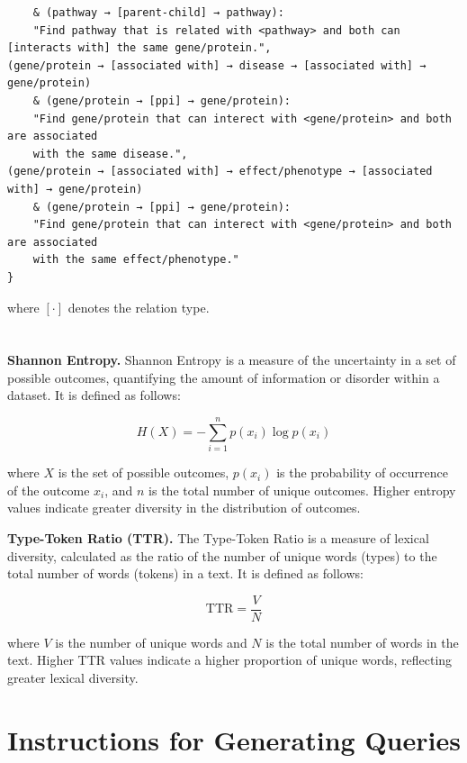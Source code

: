 \begin{mdframed}[backgroundcolor=gray!5, linecolor=black, linewidth=2pt, innerleftmargin=10pt, innerrightmargin=10pt, innertopmargin=3pt, innerbottommargin=10pt]
\begin{scriptsize}
\begin{verbatim}
    & (pathway → [parent-child] → pathway): 
    "Find pathway that is related with <pathway> and both can [interacts with] the same gene/protein.",
(gene/protein → [associated with] → disease → [associated with] → gene/protein) 
    & (gene/protein → [ppi] → gene/protein): 
    "Find gene/protein that can interect with <gene/protein> and both are associated 
    with the same disease.",
(gene/protein → [associated with] → effect/phenotype → [associated with] → gene/protein) 
    & (gene/protein → [ppi] → gene/protein): 
    "Find gene/protein that can interect with <gene/protein> and both are associated 
    with the same effect/phenotype."
}
\end{verbatim}
\end{scriptsize}
\end{mdframed}

where $[\cdot]$ denotes the relation type.
\section{}
\label{app:math}
\textbf{Shannon Entropy.} Shannon Entropy is a measure of the uncertainty in a set of possible outcomes, quantifying the amount of information or disorder within a dataset. It is defined as follows:

\[
H(X) = - \sum_{i=1}^{n} p(x_i) \log p(x_i)
\]

where \( X \) is the set of possible outcomes, \( p(x_i) \) is the probability of occurrence of the outcome \( x_i \), and \( n \) is the total number of unique outcomes. Higher entropy values indicate greater diversity in the distribution of outcomes.\cite{https://doi.org/10.1002/j.1538-7305.1948.tb01338.x}

\textbf{Type-Token Ratio (TTR).} The Type-Token Ratio is a measure of lexical diversity, calculated as the ratio of the number of unique words (types) to the total number of words (tokens) in a text. It is defined as follows:

\[
\text{TTR} = \frac{V}{N}
\]

where \( V \) is the number of unique words and \( N \) is the total number of words in the text. Higher TTR values indicate a higher proportion of unique words, reflecting greater lexical diversity. \cite{262c3ab1-41bb-3b12-a85c-0620dcf5ed8c}

\section{Instructions for Generating Queries}
\label{app:instruction}

